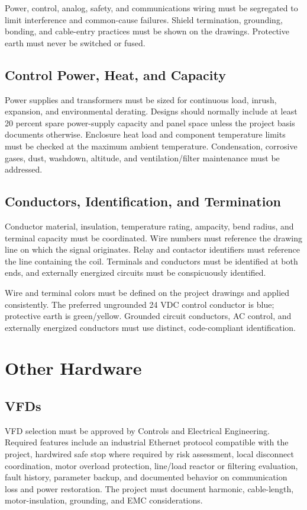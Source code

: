 Power, control, analog, safety, and communications wiring must be segregated to limit interference and common-cause failures. Shield termination, grounding, bonding, and cable-entry practices must be shown on the drawings. Protective earth must never be switched or fused.

\subsection{Control Power, Heat, and Capacity}
Power supplies and transformers must be sized for continuous load, inrush, expansion, and environmental derating. Designs should normally include at least 20 percent spare power-supply capacity and panel space unless the project basis documents otherwise. Enclosure heat load and component temperature limits must be checked at the maximum ambient temperature. Condensation, corrosive gases, dust, washdown, altitude, and ventilation/filter maintenance must be addressed.

\subsection{Conductors, Identification, and Termination}
Conductor material, insulation, temperature rating, ampacity, bend radius, and terminal capacity must be coordinated. Wire numbers must reference the drawing line on which the signal originates. Relay and contactor identifiers must reference the line containing the coil. Terminals and conductors must be identified at both ends, and externally energized circuits must be conspicuously identified.

Wire and terminal colors must be defined on the project drawings and applied consistently. The preferred ungrounded 24 VDC control conductor is blue; protective earth is green/yellow. Grounded circuit conductors, AC control, and externally energized conductors must use distinct, code-compliant identification.

\section{Other Hardware}
\subsection{VFDs}
VFD selection must be approved by Controls and Electrical Engineering. Required features include an industrial Ethernet protocol compatible with the project, hardwired safe stop where required by risk assessment, local disconnect coordination, motor overload protection, line/load reactor or filtering evaluation, fault history, parameter backup, and documented behavior on communication loss and power restoration. The project must document harmonic, cable-length, motor-insulation, grounding, and EMC considerations.
